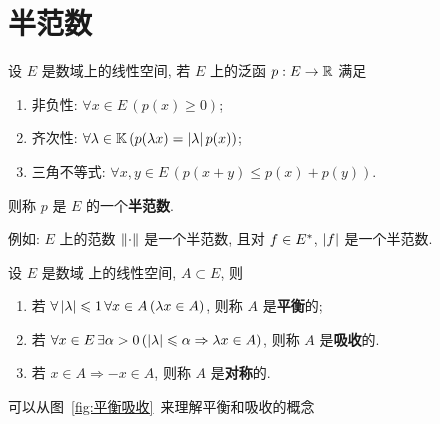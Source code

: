 \section{半范数}
\begin{Definition}[半范数]\label{def:半范数}
	设 $ E $ 是数域\K 上的线性空间, 若 $ E $ 上的泛函 $ p : E\to \mathbb{R} $ 满足
	\begin{enumerate}[(1)]
		\item 非负性: $ \forall x\in E\,(p(x)\geqslant0) $;
		\item 齐次性: $ \forall \lambda\in\mathbb{K}\,(p(\lambda x)=\left| \lambda \right| p(x)) $;
		\item 三角不等式: $ \forall x, y\in E\,(p(x+y)\leqslant p(x)+p(y)) $.
	\end{enumerate}
	则称 $ p $ 是 $ E $ 的一个\textbf{半范数}.
\end{Definition}
例如: $ E $ 上的范数 $ \left\| \cdot \right\| $ 是一个半范数, 且对 $ f\in E^{*} $, $ \left| f \right|  $ 是一个半范数.
\begin{Definition}[平衡, 吸收]\label{def:平衡吸收}
	设 $ E $ 是数域 \K 上的线性空间, $ A\subset E $, 则
	\begin{enumerate}[(1)]
		\item 若 $ \forall\left| \lambda \right| \leqslant1\,\forall x\in A\,(\lambda x\in A) $, 则称 $ A $ 是\textbf{平衡}的;
		\item 若 $ \forall x\in E\,\exists \alpha>0\,(\left| \lambda \right| \leqslant\alpha\Rightarrow\lambda x \in A) $, 则称 $ A $ 是\textbf{吸收}的. 
		\item 若 $ x\in A\Rightarrow -x\in A $, 则称 $ A $ 是\textbf{对称}的. 
	\end{enumerate}
\end{Definition}
可以从图~\ref{fig:平衡吸收}~来理解平衡和吸收的概念
